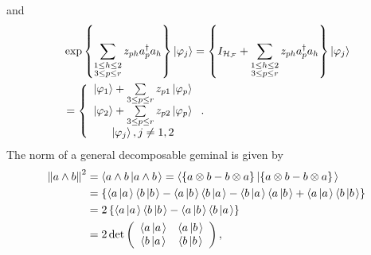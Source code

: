 \documentclass[aps,preprint]{revtex4}%
\begin{document}
and
\begin{align}
&  \exp\left\{  \sum\limits_{\substack{1\leq h\leq2\\3\leq p\leq r}%
}z_{ph}a_{p}^{\dagger}a_{h}\right\}  \left\vert \varphi_{j}\right\rangle
=\left\{  I_{\mathcal{H}_{\mathcal{F}}}+\sum\limits_{\substack{1\leq
h\leq2\\3\leq p\leq r}}z_{ph}a_{p}^{\dagger}a_{h}\right\}  \left\vert
\varphi_{j}\right\rangle \nonumber\\
&  =\left\{
\begin{array}
[c]{c}%
\left\vert \varphi_{1}\right\rangle +\sum\limits_{3\leq p\leq r}%
z_{p1}\left\vert \varphi_{p}\right\rangle \\
\left\vert \varphi_{2}\right\rangle +\sum\limits_{3\leq p\leq r}%
z_{p2}\left\vert \varphi_{p}\right\rangle \\
\left\vert \varphi_{j}\right\rangle ,j\neq1,2
\end{array}
\right.  .
\end{align}
The norm of a general decomposable geminal is given by
\begin{align}
\left\Vert a\wedge b\right\Vert ^{2}  &  =\left\langle a\wedge b\left\vert
a\wedge b\right.  \right\rangle =\left\langle \left\{  a\otimes b-b\otimes
a\right\}  \left\vert \left\{  a\otimes b-b\otimes a\right\}  \right.
\right\rangle \nonumber\\
&  =\left\{  \left\langle a\left\vert a\right.  \right\rangle \left\langle
b\left\vert b\right.  \right\rangle -\left\langle a\left\vert b\right.
\right\rangle \left\langle b\left\vert a\right.  \right\rangle -\left\langle
b\left\vert a\right.  \right\rangle \left\langle a\left\vert b\right.
\right\rangle +\left\langle a\left\vert a\right.  \right\rangle \left\langle
b\left\vert b\right.  \right\rangle \right\} \nonumber\\
&  =2\left\{  \left\langle a\left\vert a\right.  \right\rangle \left\langle
b\left\vert b\right.  \right\rangle -\left\langle a\left\vert b\right.
\right\rangle \left\langle b\left\vert a\right.  \right\rangle \right\}
\nonumber\\
&  =2\det\left(
\begin{array}
[c]{cc}%
\left\langle a\left\vert a\right.  \right\rangle  & \left\langle a\left\vert
b\right.  \right\rangle \\
\left\langle b\left\vert a\right.  \right\rangle  & \left\langle b\left\vert
b\right.  \right\rangle
\end{array}
\right)  ,
\end{align}
\end{document}
